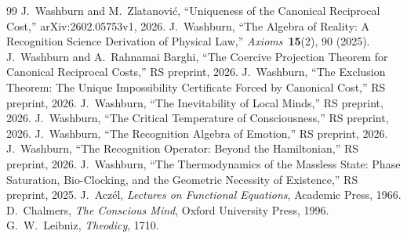 \documentclass[11pt,a4paper]{article}
\theoremstyle{plain}
\theoremstyle{definition}
\theoremstyle{remark}
\begin{document}
\begin{thebibliography}{99}
 J.~Washburn and M.~Zlatanovi\'{c},
  ``Uniqueness of the Canonical Reciprocal Cost,''
  arXiv:2602.05753v1, 2026.
 J.~Washburn,
  ``The Algebra of Reality: A Recognition Science Derivation of
  Physical Law,''
  \textit{Axioms}~\textbf{15}(2), 90 (2025).
 J.~Washburn and A.~Rahnamai Barghi,
  ``The Coercive Projection Theorem for Canonical Reciprocal Costs,''
  RS preprint, 2026.
 J.~Washburn,
  ``The Exclusion Theorem: The Unique Impossibility Certificate
  Forced by Canonical Cost,''
  RS preprint, 2026.
 J.~Washburn,
  ``The Inevitability of Local Minds,''
  RS preprint, 2026.
 J.~Washburn,
  ``The Critical Temperature of Consciousness,''
  RS preprint, 2026.
 J.~Washburn,
  ``The Recognition Algebra of Emotion,''
  RS preprint, 2026.
 J.~Washburn,
  ``The Recognition Operator: Beyond the Hamiltonian,''
  RS preprint, 2026.
 J.~Washburn,
  ``The Thermodynamics of the Massless State: Phase Saturation,
  Bio-Clocking, and the Geometric Necessity of Existence,''
  RS preprint, 2025.
 J.~Acz\'{e}l,
  \textit{Lectures on Functional Equations}, Academic Press, 1966.
 D.~Chalmers,
  \textit{The Conscious Mind}, Oxford University Press, 1996.
 G.~W.~Leibniz,
  \textit{Theodicy}, 1710.
\end{thebibliography}
\end{document}
